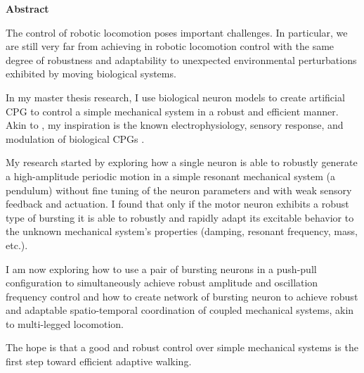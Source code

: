 \thispagestyle{plain}
\begin{center}
    \Large
    \textbf{\mytitle}
        
    \vspace{0.4cm}
    \large
    \mysubtitle
        
    \vspace{0.4cm}
    \textbf{\myname}
       
    \vspace{0.9cm}
    \textbf{Abstract}
\end{center}
The control of robotic locomotion poses important challenges. In particular, we are still very far from achieving in robotic locomotion control with the same degree of robustness and adaptability to unexpected environmental perturbations exhibited by moving biological systems.

In my master thesis research, I use biological neuron models to create artificial CPG to control a simple mechanical system in a robust and efficient manner. Akin to \citet{CPGRobot}, my inspiration is the known electrophysiology, sensory response, and modulation of biological CPGs \citet{crayfish,stickInsect,MARDER}.

My research started by exploring how a single neuron is able to robustly generate a high-amplitude periodic motion in a simple resonant mechanical system (a pendulum) without fine tuning of the neuron parameters and with weak sensory feedback and actuation. I found that only if the motor neuron exhibits a robust type of bursting \citet{burstingSlowFeedback,Franci2} it is able to robustly and rapidly adapt its excitable behavior to the unknown mechanical system's properties (damping, resonant frequency, mass, etc.).

I am now exploring how to use a pair of bursting neurons in a push-pull configuration to simultaneously achieve robust amplitude and oscillation frequency control and how to create network of bursting neuron to achieve robust and adaptable spatio-temporal coordination of coupled mechanical systems, akin to multi-legged 
locomotion.

The hope is that a good and robust control over simple mechanical systems is the first step toward efficient adaptive walking.

